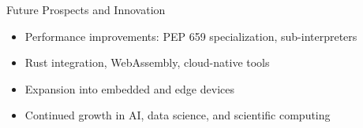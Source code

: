 \documentclass[12pt, aspectratio=169]{beamer}
\begin{document}
    \begin{frame}{Future Prospects and Innovation}
        \begin{itemize}
            \item Performance improvements: PEP 659 specialization, sub-interpreters
            \item Rust integration, WebAssembly, cloud-native tools
            \item Expansion into embedded and edge devices
            \item Continued growth in AI, data science, and scientific computing
        \end{itemize}
    \end{frame}
\end{document}
